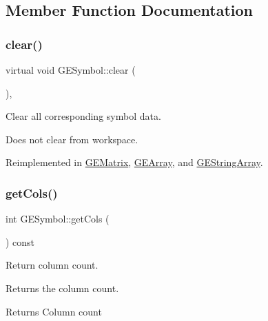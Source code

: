 \subsection{Member Function Documentation}
\mbox{\label{class_g_e_symbol_a39d2e523aec771a73e1cc5d7a9618b88}} 
\subsubsection{\texorpdfstring{clear()}{clear()}}
{\footnotesize\ttfamily virtual void G\+E\+Symbol\+::clear (\begin{DoxyParamCaption}{ }\end{DoxyParamCaption})\hspace{0.3cm}{\ttfamily [inline]}, {\ttfamily [virtual]}}



Clear all corresponding symbol data. 

Does not clear from workspace. 

Reimplemented in \hyperlink{class_g_e_matrix_a1bf6ddd9f46248e1c03c0d952d572103}{G\+E\+Matrix}, \hyperlink{class_g_e_array_ad7fd6880da03d11c13387ea9e1e1cd5d}{G\+E\+Array}, and \hyperlink{class_g_e_string_array_a9bd5bd32a9efeb1e74128bd1d7c5c57d}{G\+E\+String\+Array}.

\mbox{\label{class_g_e_symbol_a0e4ad5b8d047245375b4219ba289a02d}} 
\subsubsection{\texorpdfstring{get\+Cols()}{getCols()}}
{\footnotesize\ttfamily int G\+E\+Symbol\+::get\+Cols (\begin{DoxyParamCaption}{ }\end{DoxyParamCaption}) const\hspace{0.3cm}{\ttfamily [virtual]}}



Return column count. 

Returns the column count.

\begin{DoxyReturn}{Returns}
Column count 
\end{DoxyReturn}
\mbox{\label{class_g_e_symbol_a0bfeb930f9141b3bd57309c1f62aa6c8}} 
